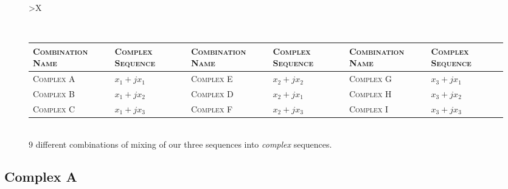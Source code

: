\documentclass[../../course]{subfiles}
\begin{document}
\begin{figure} [H]
    \centering

    \begin{tabularx} {\textwidth} {
            *{1}{>{\centering\arraybackslash}X}
        }

        \\

        { \begin{tabularx} {\textwidth} {
                *{6}{>{\centering\arraybackslash}X}
            }

            \toprule
            \textsc{Combination Name} & \textsc{Complex Sequence} &
            \textsc{Combination Name} & \textsc{Complex Sequence} &
            \textsc{Combination Name} & \textsc{Complex Sequence} \\
            \midrule

            \textsc{Complex A} & $x_{1} + j x_{1}$ &
            \textsc{Complex E} & $x_{2} + j x_{2}$ &
            \textsc{Complex G} & $x_{3} + j x_{1}$ \\

            \textsc{Complex B} & $x_{1} + j x_{2}$ &
            \textsc{Complex D} & $x_{2} + j x_{1}$ &
            \textsc{Complex H} & $x_{3} + j x_{2}$ \\

            \textsc{Complex C} & $x_{1} + j x_{3}$ &
            \textsc{Complex F} & $x_{2} + j x_{3}$ &
            \textsc{Complex I} & $x_{3} + j x_{3}$ \\

            \bottomrule

        \end{tabularx} } \\

         {
            $9$ different combinations of mixing of our three sequences into \emph{complex}
            sequences.
        }
        \label{tbl:cplxSeqs}
        \\

    \end{tabularx}


\end{figure}

\pagebreak

\subsection{Complex A}
\end{document}
